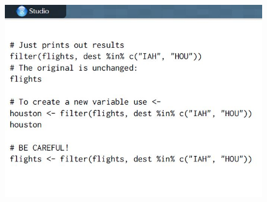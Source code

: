 \documentclass{beamer}
\begin{document}
\begin{frame}
	\begin{figure}
		\centering
		\includegraphics[width=1.05\linewidth]{images/CG-dplyr12}
	\end{figure}
\end{frame}
\end{document}
